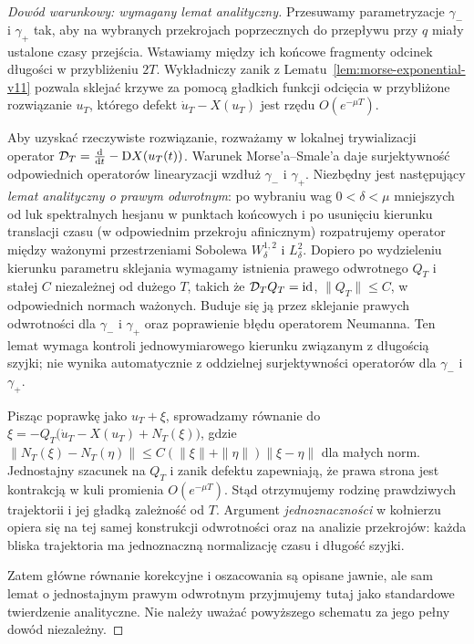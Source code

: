 \begin{proof}[Dowód warunkowy: wymagany lemat analityczny]
Przesuwamy parametryzacje $\gamma_-$ i $\gamma_+$ tak,
aby na wybranych przekrojach poprzecznych do przepływu
przy $q$ miały ustalone czasy przejścia. Wstawiamy między
ich końcowe fragmenty odcinek długości w przybliżeniu $2T$.
Wykładniczy zanik z Lematu~\ref{lem:morse-exponential-v11}
pozwala sklejać krzywe za pomocą gładkich funkcji odcięcia
w przybliżone rozwiązanie $u_T$, którego defekt
$\dot u_T-X(u_T)$ jest rzędu $O(e^{-\mu T})$.

Aby uzyskać rzeczywiste rozwiązanie, rozważamy w lokalnej
trywializacji operator
$\mathcal D_T=\tfrac{\mathrm d}{\mathrm d t}-\mathrm D X(u_T(t))$.
Warunek Morse'a--Smale'a daje surjektywność odpowiednich
operatorów linearyzacji wzdłuż $\gamma_-$ i $\gamma_+$.
Niezbędny jest następujący \emph{lemat analityczny o prawym
odwrotnym}: po wybraniu wag $0<\delta<\mu$ mniejszych od luk
spektralnych hesjanu w punktach końcowych i po
usunięciu kierunku translacji czasu (w odpowiednim
przekroju afinicznym) rozpatrujemy operator między
ważonymi przestrzeniami Sobolewa $W^{1,2}_\delta$
i $L^2_\delta$. Dopiero po wydzieleniu kierunku
parametru sklejania wymagamy istnienia prawego odwrotnego
$Q_T$ i stałej $C$ niezależnej od dużego $T$, takich że
$\mathcal D_TQ_T=\mathrm{id}$, $\|Q_T\|\le C$, w odpowiednich
normach ważonych. Buduje się ją przez sklejanie prawych
odwrotności dla $\gamma_-$ i $\gamma_+$ oraz poprawienie
błędu operatorem Neumanna. Ten lemat wymaga kontroli
jednowymiarowego kierunku związanym z długością szyjki;
nie wynika automatycznie z oddzielnej surjektywności
operatorów dla $\gamma_-$ i $\gamma_+$.

Pisząc poprawkę jako $u_T+\xi$, sprowadzamy równanie do
$\xi=-Q_T\bigl(\dot u_T-X(u_T)+N_T(\xi)\bigr)$,
gdzie $\|N_T(\xi)-N_T(\eta)\|\le
C(\|\xi\|+\|\eta\|)\|\xi-\eta\|$ dla małych norm.
Jednostajny szacunek na $Q_T$ i zanik defektu zapewniają,
że prawa strona jest kontrakcją w kuli promienia
$O(e^{-\mu T})$. Stąd otrzymujemy rodzinę prawdziwych
trajektorii i jej gładką zależność od $T$.
Argument \emph{jednoznaczności} w kołnierzu opiera się na
tej samej konstrukcji odwrotności oraz na analizie
przekrojów: każda bliska trajektoria ma jednoznaczną
normalizację czasu i długość szyjki.

Zatem główne równanie korekcyjne i oszacowania są opisane
jawnie, ale sam lemat o jednostajnym prawym odwrotnym
przyjmujemy tutaj jako standardowe twierdzenie analityczne.
Nie należy uważać powyższego schematu za jego pełny
dowód niezależny.
\end{proof}

